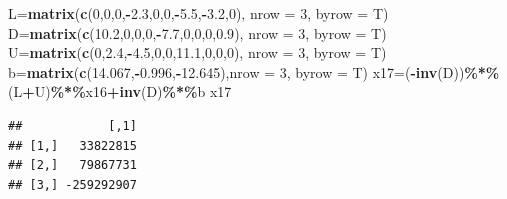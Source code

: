 \documentclass[
]{article}
\newenvironment{Shaded}{\begin{snugshade}}{\end{snugshade}}
\newcommand{\AttributeTok}[1]{\textcolor[rgb]{0.13,0.29,0.53}{#1}}
\newcommand{\DecValTok}[1]{\textcolor[rgb]{0.00,0.00,0.81}{#1}}
\newcommand{\FloatTok}[1]{\textcolor[rgb]{0.00,0.00,0.81}{#1}}
\newcommand{\FunctionTok}[1]{\textcolor[rgb]{0.13,0.29,0.53}{\textbf{#1}}}
\newcommand{\NormalTok}[1]{#1}
\newcommand{\OtherTok}[1]{\textcolor[rgb]{0.56,0.35,0.01}{#1}}
\newcommand{\SpecialCharTok}[1]{\textcolor[rgb]{0.81,0.36,0.00}{\textbf{#1}}}
\begin{document}
\begin{Shaded}
\begin{Highlighting}[]
\NormalTok{  L}\OtherTok{=}\FunctionTok{matrix}\NormalTok{(}\FunctionTok{c}\NormalTok{(}\DecValTok{0}\NormalTok{,}\DecValTok{0}\NormalTok{,}\DecValTok{0}\NormalTok{,}\SpecialCharTok{{-}}\FloatTok{2.3}\NormalTok{,}\DecValTok{0}\NormalTok{,}\DecValTok{0}\NormalTok{,}\SpecialCharTok{{-}}\FloatTok{5.5}\NormalTok{,}\SpecialCharTok{{-}}\FloatTok{3.2}\NormalTok{,}\DecValTok{0}\NormalTok{), }\AttributeTok{nrow =} \DecValTok{3}\NormalTok{, }\AttributeTok{byrow =}\NormalTok{ T)}
\NormalTok{  D}\OtherTok{=}\FunctionTok{matrix}\NormalTok{(}\FunctionTok{c}\NormalTok{(}\FloatTok{10.2}\NormalTok{,}\DecValTok{0}\NormalTok{,}\DecValTok{0}\NormalTok{,}\DecValTok{0}\NormalTok{,}\SpecialCharTok{{-}}\FloatTok{7.7}\NormalTok{,}\DecValTok{0}\NormalTok{,}\DecValTok{0}\NormalTok{,}\DecValTok{0}\NormalTok{,}\FloatTok{0.9}\NormalTok{), }\AttributeTok{nrow =} \DecValTok{3}\NormalTok{, }\AttributeTok{byrow =}\NormalTok{ T)}
\NormalTok{  U}\OtherTok{=}\FunctionTok{matrix}\NormalTok{(}\FunctionTok{c}\NormalTok{(}\DecValTok{0}\NormalTok{,}\FloatTok{2.4}\NormalTok{,}\SpecialCharTok{{-}}\FloatTok{4.5}\NormalTok{,}\DecValTok{0}\NormalTok{,}\DecValTok{0}\NormalTok{,}\FloatTok{11.1}\NormalTok{,}\DecValTok{0}\NormalTok{,}\DecValTok{0}\NormalTok{,}\DecValTok{0}\NormalTok{), }\AttributeTok{nrow =} \DecValTok{3}\NormalTok{, }\AttributeTok{byrow =}\NormalTok{ T)}
\NormalTok{  b}\OtherTok{=}\FunctionTok{matrix}\NormalTok{(}\FunctionTok{c}\NormalTok{(}\FloatTok{14.067}\NormalTok{,}\SpecialCharTok{{-}}\FloatTok{0.996}\NormalTok{,}\SpecialCharTok{{-}}\FloatTok{12.645}\NormalTok{),}\AttributeTok{nrow =} \DecValTok{3}\NormalTok{, }\AttributeTok{byrow =}\NormalTok{ T)}
\NormalTok{  x17}\OtherTok{=}\NormalTok{(}\SpecialCharTok{{-}}\FunctionTok{inv}\NormalTok{(D))}\SpecialCharTok{\%*\%}\NormalTok{(L}\SpecialCharTok{+}\NormalTok{U)}\SpecialCharTok{\%*\%}\NormalTok{x16}\SpecialCharTok{+}\FunctionTok{inv}\NormalTok{(D)}\SpecialCharTok{\%*\%}\NormalTok{b}
\NormalTok{  x17}
\end{Highlighting}
\end{Shaded}

\begin{verbatim}
##            [,1]
## [1,]   33822815
## [2,]   79867731
## [3,] -259292907
\end{verbatim}
\end{document}
